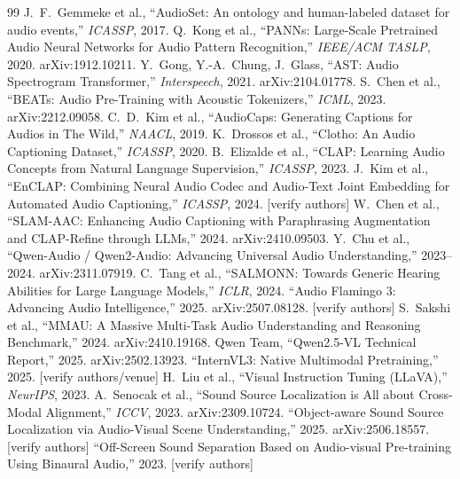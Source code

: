 \documentclass[11pt,a4paper]{article}
\begin{document}
\begin{thebibliography}{99}
\footnotesize
{} J.\ F.\ Gemmeke et al., ``AudioSet: An ontology and human-labeled dataset for audio events,'' \emph{ICASSP}, 2017.
 Q.\ Kong et al., ``PANNs: Large-Scale Pretrained Audio Neural Networks for Audio Pattern Recognition,'' \emph{IEEE/ACM TASLP}, 2020. arXiv:1912.10211.
 Y.\ Gong, Y.-A.\ Chung, J.\ Glass, ``AST: Audio Spectrogram Transformer,'' \emph{Interspeech}, 2021. arXiv:2104.01778.
 S.\ Chen et al., ``BEATs: Audio Pre-Training with Acoustic Tokenizers,'' \emph{ICML}, 2023. arXiv:2212.09058.
 C.\ D.\ Kim et al., ``AudioCaps: Generating Captions for Audios in The Wild,'' \emph{NAACL}, 2019.
 K.\ Drossos et al., ``Clotho: An Audio Captioning Dataset,'' \emph{ICASSP}, 2020.
 B.\ Elizalde et al., ``CLAP: Learning Audio Concepts from Natural Language Supervision,'' \emph{ICASSP}, 2023.
 J.\ Kim et al., ``EnCLAP: Combining Neural Audio Codec and Audio-Text Joint Embedding for Automated Audio Captioning,'' \emph{ICASSP}, 2024. [verify authors]
 W.\ Chen et al., ``SLAM-AAC: Enhancing Audio Captioning with Paraphrasing Augmentation and CLAP-Refine through LLMs,'' 2024. arXiv:2410.09503.
 Y.\ Chu et al., ``Qwen-Audio / Qwen2-Audio: Advancing Universal Audio Understanding,'' 2023--2024. arXiv:2311.07919.
 C.\ Tang et al., ``SALMONN: Towards Generic Hearing Abilities for Large Language Models,'' \emph{ICLR}, 2024.
 ``Audio Flamingo 3: Advancing Audio Intelligence,'' 2025. arXiv:2507.08128. [verify authors]
 S.\ Sakshi et al., ``MMAU: A Massive Multi-Task Audio Understanding and Reasoning Benchmark,'' 2024. arXiv:2410.19168.
 Qwen Team, ``Qwen2.5-VL Technical Report,'' 2025. arXiv:2502.13923.
 ``InternVL3: Native Multimodal Pretraining,'' 2025. [verify authors/venue]
 H.\ Liu et al., ``Visual Instruction Tuning (LLaVA),'' \emph{NeurIPS}, 2023.
 A.\ Senocak et al., ``Sound Source Localization is All about Cross-Modal Alignment,'' \emph{ICCV}, 2023. arXiv:2309.10724.
 ``Object-aware Sound Source Localization via Audio-Visual Scene Understanding,'' 2025. arXiv:2506.18557. [verify authors]
 ``Off-Screen Sound Separation Based on Audio-visual Pre-training Using Binaural Audio,'' 2023. [verify authors]

\end{thebibliography}
\end{document}
